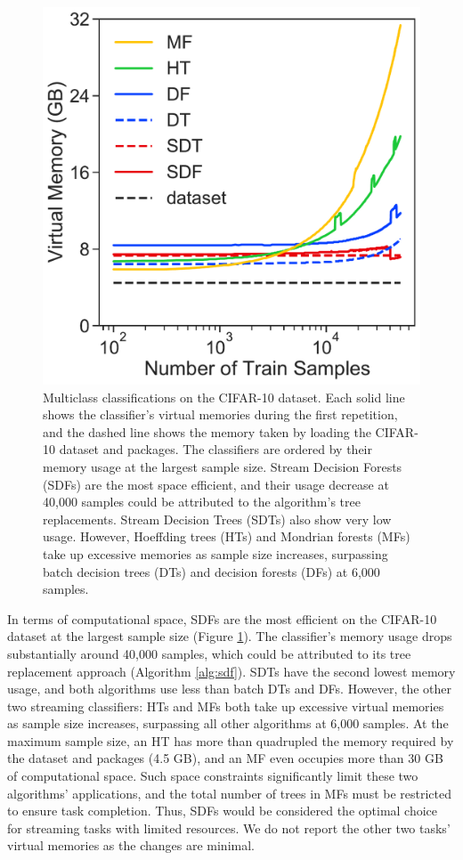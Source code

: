 \begin{figure}[!htb]
\centering
\includegraphics[width=0.4\columnwidth]{select_cifar_mem}
  \caption{Multiclass classifications on the CIFAR-10 dataset. Each solid line shows the classifier's virtual memories during the first repetition, and the dashed line shows the memory taken by loading the CIFAR-10 dataset and packages. The classifiers are ordered by their memory usage at the largest sample size. Stream Decision Forests (SDFs) are the most space efficient, and their usage decrease at 40,000 samples could be attributed to the algorithm's tree replacements. Stream Decision Trees (SDTs) also show very low usage. However, Hoeffding trees (HTs) and Mondrian forests (MFs) take up excessive memories as sample size increases, surpassing batch decision trees (DTs) and decision forests (DFs) at 6,000 samples.
  }
\label{fig:select_cifar_mem}
\end{figure}

In terms of computational space, SDFs are the most efficient on the CIFAR-10 dataset at the largest sample size (Figure \ref{fig:select_cifar_mem}). The classifier's memory usage drops substantially around 40,000 samples, which could be attributed to its tree replacement approach (Algorithm \ref{alg:sdf}). SDTs have the second lowest memory usage, and both algorithms use less than batch DTs and DFs. 
However, the other two streaming classifiers: HTs and MFs both take up excessive virtual memories as sample size increases, surpassing all other algorithms at 6,000 samples.
At the maximum sample size, an HT has more than quadrupled the memory required by the dataset and packages (4.5 GB), and an MF even occupies more than 30 GB of computational space. Such space constraints significantly limit these two algorithms' applications, and the total number of trees in MFs must be restricted to ensure task completion. 
Thus, SDFs would be considered the optimal choice for streaming tasks with limited resources. We do not report the other two tasks' virtual memories as the changes are minimal. 

